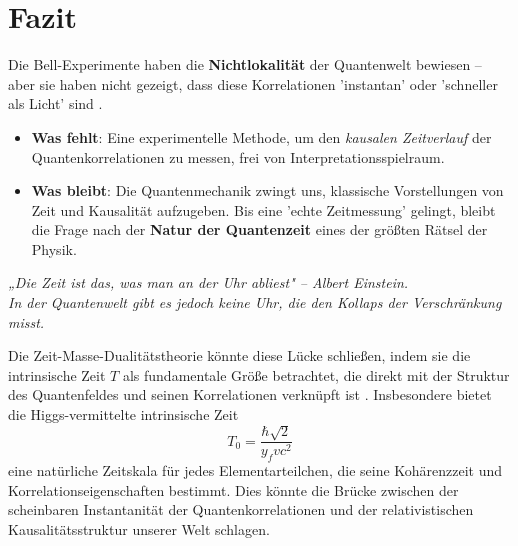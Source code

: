 \documentclass[a4paper,12pt]{article}
\begin{document}
	\section{Fazit}
	
	Die Bell-Experimente haben die \textbf{Nichtlokalität} der Quantenwelt bewiesen – aber sie haben nicht gezeigt, dass diese Korrelationen 'instantan' oder 'schneller als Licht' sind \cite{Shimony2017}.
	\begin{itemize}
		\item \textbf{Was fehlt}: Eine experimentelle Methode, um den \textit{kausalen Zeitverlauf} der Quantenkorrelationen zu messen, frei von Interpretationsspielraum.
		\item \textbf{Was bleibt}: Die Quantenmechanik zwingt uns, klassische Vorstellungen von Zeit und Kausalität aufzugeben. Bis eine 'echte Zeitmessung' gelingt, bleibt die Frage nach der \textbf{Natur der Quantenzeit} eines der größten Rätsel der Physik.
	\end{itemize}
	
	\textit{„Die Zeit ist das, was man an der Uhr abliest" – Albert Einstein.\\  
		In der Quantenwelt gibt es jedoch keine Uhr, die den Kollaps der Verschränkung misst.}
	
	Die Zeit-Masse-Dualitätstheorie könnte diese Lücke schließen, indem sie die intrinsische Zeit $T$ als fundamentale Größe betrachtet, die direkt mit der Struktur des Quantenfeldes und seinen Korrelationen verknüpft ist \cite{Pascher2024}. Insbesondere bietet die Higgs-vermittelte intrinsische Zeit
	\begin{equation}
		T_0 = \frac{\hbar \sqrt{2}}{y_f v c^2}
	\end{equation}
	eine natürliche Zeitskala für jedes Elementarteilchen, die seine Kohärenzzeit und Korrelationseigenschaften bestimmt. Dies könnte die Brücke zwischen der scheinbaren Instantanität der Quantenkorrelationen und der relativistischen Kausalitätsstruktur unserer Welt schlagen.
	
\end{document}
